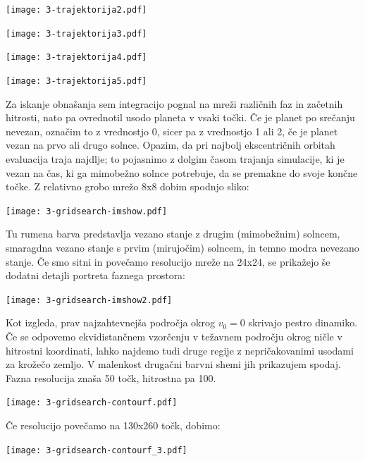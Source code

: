 \begin{center}
     \texttt{[image: 3-trajektorija2.pdf]}
\end{center}
\begin{center}
     \texttt{[image: 3-trajektorija3.pdf]}
\end{center}
\begin{center}
     \texttt{[image: 3-trajektorija4.pdf]}
\end{center}
\begin{center}
     \texttt{[image: 3-trajektorija5.pdf]}
\end{center}
Za iskanje obnašanja sem integracijo pognal na mreži različnih faz in začetnih hitrosti, nato pa ovrednotil usodo planeta v vsaki točki. Če je planet po srečanju nevezan, označim to z vrednostjo 0, sicer pa z vrednostjo 1 ali 2, če je planet vezan na prvo ali drugo solnce. Opazim, da pri najbolj ekscentričnih orbitah evaluacija traja najdlje; to pojasnimo z dolgim časom trajanja simulacije, ki je vezan na čas, ki ga mimobežno solnce potrebuje, da se premakne do svoje končne točke. Z relativno grobo mrežo 8x8 dobim spodnjo sliko:
\begin{center}
     \texttt{[image: 3-gridsearch-imshow.pdf]}
\end{center}
Tu rumena barva predstavlja vezano stanje z drugim (mimobežnim) solncem, smaragdna vezano stanje s prvim (mirujočim) solncem, in temno modra nevezano stanje. Če smo sitni in povečamo resolucijo mreže na 24x24, se prikažejo še dodatni detajli portreta faznega prostora:
\begin{center}
     \texttt{[image: 3-gridsearch-imshow2.pdf]}
\end{center}
Kot izgleda, prav najzahtevnejša področja okrog $v_0 = 0$ skrivajo pestro dinamiko. Če se odpovemo ekvidistančnem vzorčenju v težavnem področju okrog ničle v hitrostni koordinati, lahko najdemo tudi druge regije z nepričakovanimi usodami za krožečo zemljo. V malenkost drugačni barvni shemi jih prikazujem spodaj. Fazna resolucija znaša 50 točk, hitrostna pa 100.
\begin{center}
     \texttt{[image: 3-gridsearch-contourf.pdf]}
\end{center}
Če resolucijo povečamo na 130x260 točk, dobimo:
\begin{center}
     \texttt{[image: 3-gridsearch-contourf\_3.pdf]}
\end{center}